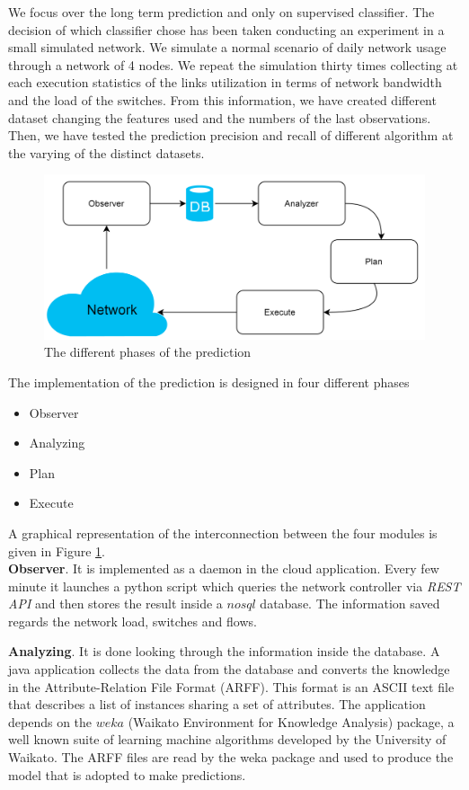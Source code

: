 \documentclass[12pt]{article}
\begin{document}
We focus over the long term prediction and only on supervised classifier.
The decision of which classifier chose has been taken conducting an experiment in a small simulated network. 
We simulate a normal scenario of daily network usage through a network of 4 nodes. 
We repeat the simulation thirty times collecting at each execution statistics of the links utilization in terms of network bandwidth and the load of the switches.
From this information, we have created different dataset changing the features used and the numbers of the last observations.
Then, we have tested the prediction precision and recall of different algorithm at the varying of the distinct datasets. 
\begin{figure}[h!]
	\centering
	\includegraphics[width=1\textwidth]{img/predictionGraph.png}
	\caption[]
	{The different phases of the prediction}
	\label{fig:predictionConf}
\end{figure}


The implementation of the prediction is designed in four different phases
\begin{itemize}
	\item Observer
	\item Analyzing
	\item Plan
	\item Execute
\end{itemize}
A graphical representation of the interconnection between the four modules is given in Figure \ref{fig:predictionConf}.\\


\textbf{Observer}. It is implemented as a daemon in the cloud application. 
Every few minute it launches a python script which queries the network controller via 	\textit{REST API} and then stores the result inside a $nosql$ database.
The information saved regards the network load, switches and flows.



\textbf{Analyzing}. It is done looking through the information inside the database. 
A java application collects the data from the database and converts the knowledge in the Attribute-Relation File Format (ARFF). 
This format is an ASCII text file that describes a list of instances sharing a set of attributes.
The application depends on the $weka$ (Waikato Environment for Knowledge Analysis) package, a well known suite of learning machine algorithms developed by the University of Waikato.
The ARFF files are read by the weka package and used to produce the model that is adopted to make predictions.
\end{document}
